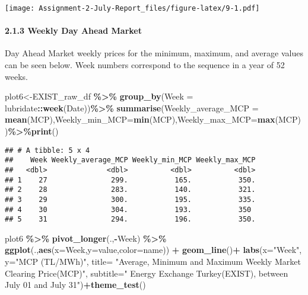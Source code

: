 \documentclass[
]{article}
\newenvironment{Shaded}{\begin{snugshade}}{\end{snugshade}}
\newcommand{\DataTypeTok}[1]{\textcolor[rgb]{0.13,0.29,0.53}{#1}}
\newcommand{\KeywordTok}[1]{\textcolor[rgb]{0.13,0.29,0.53}{\textbf{#1}}}
\newcommand{\NormalTok}[1]{#1}
\newcommand{\OperatorTok}[1]{\textcolor[rgb]{0.81,0.36,0.00}{\textbf{#1}}}
\newcommand{\StringTok}[1]{\textcolor[rgb]{0.31,0.60,0.02}{#1}}
\begin{document}
\texttt{[image: Assignment-2-July-Report\_files/figure-latex/9-1.pdf]}

\hypertarget{weekly-day-ahead-market}{%
\paragraph{2.1.3 Weekly Day Ahead
Market}\label{weekly-day-ahead-market}}

Day Ahead Market weekly prices for the minimum, maximum, and average
values can be seen below. Week numbers correspond to the sequence in a
year of 52 weeks.

\begin{Shaded}
\begin{Highlighting}[]
\NormalTok{plot6\textless{}{-}EXIST\_raw\_df }\OperatorTok{\%\textgreater{}\%}\StringTok{ }\KeywordTok{group\_by}\NormalTok{(}\DataTypeTok{Week =}\NormalTok{ lubridate}\OperatorTok{::}\KeywordTok{week}\NormalTok{(Date))}\OperatorTok{\%\textgreater{}\%}\StringTok{ }\KeywordTok{summarise}\NormalTok{(}\DataTypeTok{Weekly\_average\_MCP =} \KeywordTok{mean}\NormalTok{(MCP),}\DataTypeTok{Weekly\_min\_MCP=}\KeywordTok{min}\NormalTok{(MCP),}\DataTypeTok{Weekly\_max\_MCP=}\KeywordTok{max}\NormalTok{(MCP))}\OperatorTok{\%\textgreater{}\%}\KeywordTok{print}\NormalTok{()}
\end{Highlighting}
\end{Shaded}

\begin{verbatim}
## # A tibble: 5 x 4
##    Week Weekly_average_MCP Weekly_min_MCP Weekly_max_MCP
##   <dbl>              <dbl>          <dbl>          <dbl>
## 1    27               299.           165.           350.
## 2    28               283.           140.           321.
## 3    29               300.           195.           335.
## 4    30               304.           193.           350 
## 5    31               294.           196.           350.
\end{verbatim}

\begin{Shaded}
\begin{Highlighting}[]
\NormalTok{plot6 }\OperatorTok{\%\textgreater{}\%}\StringTok{ }\KeywordTok{pivot\_longer}\NormalTok{(.,}\OperatorTok{{-}}\NormalTok{Week) }\OperatorTok{\%\textgreater{}\%}\StringTok{ }\KeywordTok{ggplot}\NormalTok{(.,}\KeywordTok{aes}\NormalTok{(}\DataTypeTok{x=}\NormalTok{Week,}\DataTypeTok{y=}\NormalTok{value,}\DataTypeTok{color=}\NormalTok{name)) }\OperatorTok{+}\StringTok{ }\KeywordTok{geom\_line}\NormalTok{()}\OperatorTok{+}
\StringTok{      }\KeywordTok{labs}\NormalTok{(}\DataTypeTok{x=}\StringTok{"Week"}\NormalTok{, }\DataTypeTok{y=}\StringTok{"MCP (TL/MWh)"}\NormalTok{, }
           \DataTypeTok{title=}  \StringTok{"Average, Minimum and Maximum Weekly Market Clearing Price(MCP)"}\NormalTok{,}
           \DataTypeTok{subtitle=}\StringTok{" Energy Exchange Turkey(EXIST), between July 01 and July 31"}\NormalTok{)}\OperatorTok{+}\KeywordTok{theme\_test}\NormalTok{()}
\end{Highlighting}
\end{Shaded}
\end{document}
